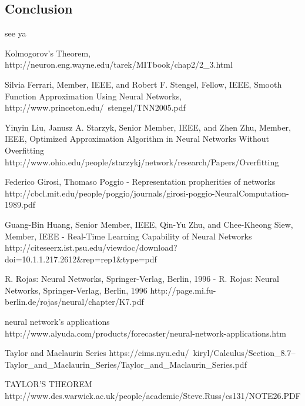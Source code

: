 \documentclass[10pt,a5paper]{article}
\begin{document}
\subsection{Conclusion}

see ya




\begin{thebibliography}{4}

 Kolmogorov's Theorem,
http://neuron.eng.wayne.edu/tarek/MITbook/chap2/2\_3.html

 Silvia Ferrari, Member, IEEE, and Robert F. Stengel, Fellow, IEEE, Smooth Function Approximation Using
Neural Networks, http://www.princeton.edu/~stengel/TNN2005.pdf

 Yinyin Liu, Janusz A. Starzyk, Senior Member, IEEE, and Zhen Zhu, Member, IEEE,  Optimized Approximation Algorithm in Neural Networks Without Overfitting
http://www.ohio.edu/people/starzykj/network/research/Papers/Overfitting%

 Federico Girosi, Thomaso Poggio - Representation propherities of networks
http://cbcl.mit.edu/people/poggio/journals/girosi-poggio-NeuralComputation-1989.pdf

 Guang-Bin Huang, Senior Member, IEEE,  Qin-Yu Zhu, and  Chee-Kheong Siew, Member, IEEE -  Real-Time Learning Capability of Neural Networks
http://citeseerx.ist.psu.edu/viewdoc/download?doi=10.1.1.217.2612\&rep=rep1\&type=pdf

 R. Rojas: Neural Networks, Springer-Verlag, Berlin, 1996 - R. Rojas: Neural Networks, Springer-Verlag, Berlin, 1996
http://page.mi.fu-berlin.de/rojas/neural/chapter/K7.pdf

 neural network's applications
http://www.alyuda.com/products/forecaster/neural-network-applications.htm

 Taylor and Maclaurin Series
https://cims.nyu.edu/~kiryl/Calculus/Section\_8.7--Taylor\_and\_Maclaurin\_Series/Taylor\_and\_Maclaurin\_Series.pdf

 TAYLOR’S THEOREM
http://www.dcs.warwick.ac.uk/people/academic/Steve.Russ/cs131/NOTE26.PDF


\end{thebibliography}
\end{document}
